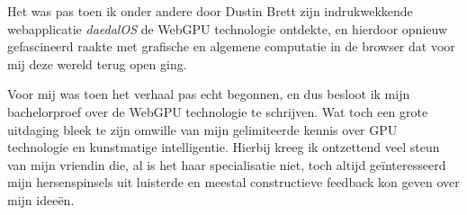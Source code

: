 \bigbreak{}

Het was pas toen ik onder andere door Dustin Brett zijn indrukwekkende webapplicatie \textit{daedalOS} de WebGPU technologie ontdekte, en hierdoor opnieuw gefascineerd raakte met grafische en algemene computatie in de browser dat voor mij deze wereld terug open ging.

\bigbreak{}

Voor mij was toen het verhaal pas echt begonnen, en dus besloot ik mijn bachelorproef over de WebGPU technologie te schrijven. Wat toch een grote uitdaging bleek te zijn omwille van mijn gelimiteerde kennis over GPU technologie en kunstmatige intelligentie. Hierbij kreeg ik ontzettend veel steun van mijn vriendin die, al is het haar specialisatie niet, toch altijd geïnteresseerd mijn hersenspinsels uit luisterde en meestal constructieve feedback kon geven over mijn ideeën.